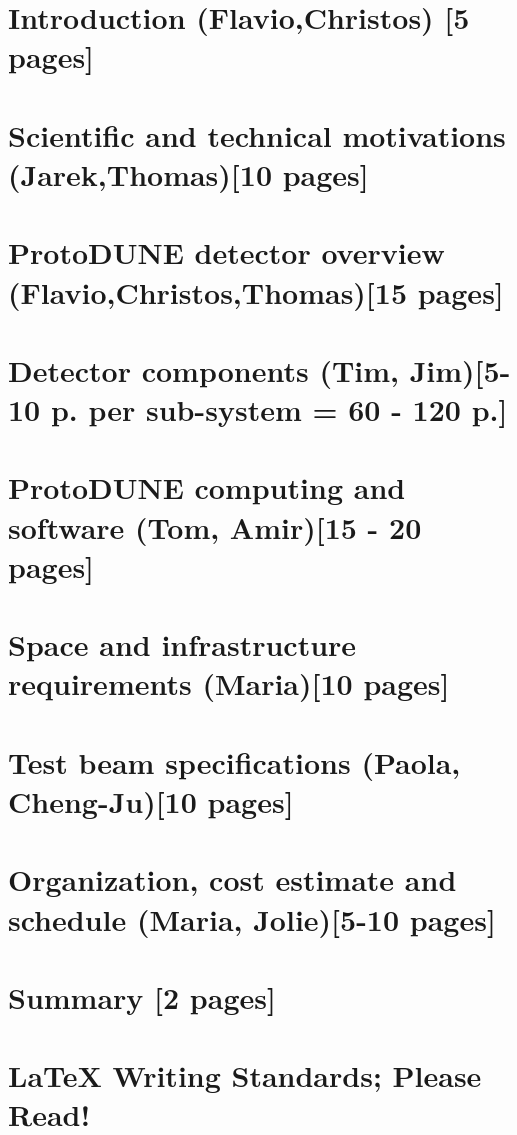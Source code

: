 \ifdefined\isfinal\documentclass[final]{pd-tdr}\else\documentclass{pd-tdr}\fi
\begin{document}






\chapter{Introduction {\color{red} (Flavio,Christos) [5 pages]}}


\chapter{Scientific and technical motivations {\color{red} (Jarek,Thomas)[10 pages]}}


\chapter{ProtoDUNE detector overview {\color{red} (Flavio,Christos,Thomas)[15 pages]}}


\chapter{Detector components {\color{red} (Tim, Jim)[5-10 p. per sub-system = 60 - 120 p.]}}


\chapter{ProtoDUNE computing and software {\color{red} (Tom, Amir)[15 - 20 pages]}}


\chapter{Space and infrastructure requirements {\color{red} (Maria)[10 pages]}}


\chapter{Test beam specifications {\color{red} (Paola, Cheng-Ju)[10 pages]}} 


\chapter{Organization, cost estimate and schedule {\color{red}  (Maria, Jolie)[5-10 pages]}}




%
% 


\newpage
\chapter{Summary {\color{red}[2 pages]}}
%

\appendix

\chapter{LaTeX Writing Standards; Please Read!}



% 

\cleardoublepage


\end{document}

